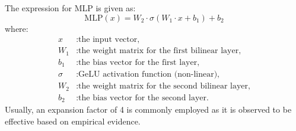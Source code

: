 The expression for MLP is given as:\\

\[\text{MLP}(x) = W_2 \cdot \sigma(W_1 \cdot x + b_1) + b_2\]
where:
\begin{align*}
    x      & : \text{the input vector,}                                \\
    W_1    & : \text{the weight matrix for the first bilinear layer,}  \\
    b_1    & : \text{the bias vector for the first layer,}             \\
    \sigma & : \text{GeLU activation function (non-linear),}           \\
    W_2    & : \text{the weight matrix for the second bilinear layer,} \\
    b_2    & : \text{the bias vector for the second layer.}
\end{align*}
Usually, an expansion factor of 4 is commonly employed as it is observed to be effective based on empirical evidence.\\
\\

